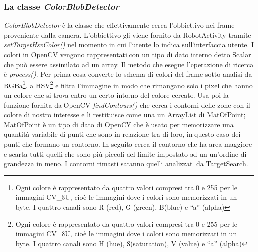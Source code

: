 \subsubsection{La classe \emph{ColorBlobDetector}}
\emph{ColorBlobDetector} è la classe che effettivamente cerca l'obbiettivo nei
frame proveniente dalla camera. L'obbiettivo gli viene fornito da RobotActivity 
tramite \emph{setTargetHsvColor()} nel momento in cui l'utente lo indica 
sull'interfaccia utente. I colori in OpenCV vengono rappresentati con un tipo di dato interno
detto Scalar che può essere assimilato ad un array. Il metodo che esegue 
l'operazione di ricerca è \emph{process()}. Per prima cosa converte lo schema di 
colori del frame sotto analisi da RGBa\footnote{Ogni colore è rappresentato da 
quattro valori compresi tra 0 e 255 per le immagini CV_8U, cioè le immagini dove 
i colori sono memorizzati in un byte. I quattro canali sono R (red), G (green), 
B(blue) e ``a'' (alpha) }. a HSV\footnote{Ogni colore è rappresentato da quattro 
valori compresi tra 0 e 255 per le immagini CV_8U, cioè le immagini dove 
i colori sono memorizzati in un byte. I quattro canali sono H (hue), S(saturation), 
V (value) e  ``a'' (alpha)} e filtra l'immagine in modo che rimangano solo 
i pixel che hanno un colore che si trova entro un certo intorno del colore cercato.
Usa poi la funzione fornita da OpenCV \emph{findContours()} che cerca i contorni delle
zone con il colore di nostro interesse e li restituisce come una un ArrayList di MatOfPoint;
MatOfPoint è un tipo di dato di OpenCV che è usato per memorizzare una quantità variabile
di punti che sono in relazione tra di loro, in questo caso dei punti che formano un contorno.
In seguito cerca il contorno che ha area maggiore e scarta tutti quelli che sono più piccoli 
del limite impostato ad un un'ordine di grandezza in meno. I contorni rimasti 
saranno quelli analizzati da TargetSearch.


